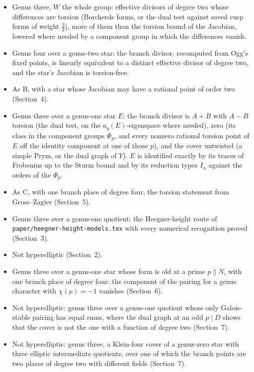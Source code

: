 \documentclass[11pt,reqno]{amsart}
\theoremstyle{plain}
\theoremstyle{definition}
\begin{document}
\begin{itemize}
\item[A] Genus three, $W$ the whole group: effective divisors of degree two whose differences are torsion
(Borcherds forms, or the dual test against saved cusp forms of weight $\frac32$), more of them than the torsion
bound of the Jacobian, lowered where needed by a component group in which the differences vanish.
\item[B] Genus four over a genus-two star: the branch divisor, recomputed from Ogg's fixed points, is linearly
equivalent to a distinct effective divisor of degree two, and the star's Jacobian is torsion-free.
\item[B2] As B, with a star whose Jacobian may have a rational point of order two (Section~4).
\item[C] Genus three over a genus-one star $E$: the branch divisor is $A+B$ with $A-B$ torsion (the dual test,
on the $a_q(E)$-eigenspace where needed), zero (its class in the component groups $\Phi_p$, and every nonzero
rational torsion point of $E$ off the identity component at one of those $p$), and the cover untwisted (a
simple Prym, or the dual graph of $Y$). $E$ is identified exactly by its traces of Frobenius up to the Sturm
bound and by its reduction types $I_n$ against the orders of the $\Phi_p$.
\item[C4] As C, with one branch place of degree four, the torsion statement from Gross--Zagier (Section~5).
\item[D] Genus three over a genus-one quotient: the Heegner-height route of \texttt{paper/heegner-height-models.tex}
with every numerical recognition proved (Section~3).
\item[N] Not hyperelliptic (Section~2).
\item[O] Genus three over a genus-one star whose form is old at a prime $p\parallel N$, with one branch place of
degree four: the component of the pairing for a genus character with $\chi(p)=-1$ vanishes (Section~6).
\item[T] Not hyperelliptic: genus three over a genus-one quotient whose only Galois-stable pairing has equal sums,
where the dual graph at an odd $p\mid D$ shows that the cover is not the one with a function of degree two
(Section~7).
\item[V] Not hyperelliptic: genus three, a Klein-four cover of a genus-zero star with three elliptic intermediate
quotients, over one of which the branch points are two places of degree two with different fields (Section~7).
\end{itemize}
\end{document}
